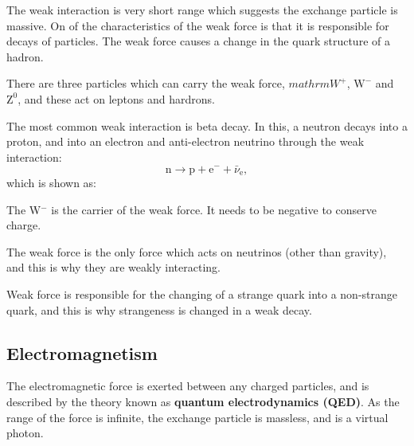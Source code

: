 \documentclass[a4paper,12pt]{article}
\begin{document}
The weak interaction is very short range which suggests the exchange particle is massive.  On of the characteristics of the weak force is that it is responsible for decays of particles.  The weak force causes a change in the quark structure of a hadron.

There are three particles which can carry the weak force, $mathrm{W}^{+}$, $\mathrm{W}^{-}$ and $\mathrm{Z}^{0}$, and these act on leptons and hardrons.

The most common weak interaction is beta decay.  In this, a neutron decays into a proton, and into an electron and anti-electron neutrino through the weak interaction:
\[\mathrm{n}\longrightarrow\mathrm{p}+\mathrm{e}^{-}+\bar{\nu}_\mathrm{e},\]
which is shown as:\\

\noindent \begin{minipage}{0.5\textwidth}
\end{minipage}
\begin{minipage}{0.5\textwidth}
The W$^{-}$ is the carrier of the weak force.  It needs to be negative to conserve charge.
\end{minipage}

The weak force is the only force which acts on neutrinos (other than gravity), and this is why they are weakly interacting.

Weak force is responsible for the changing of a strange quark into a non-strange quark, and this is why strangeness is changed in a weak decay.

\subsection{Electromagnetism}

The electromagnetic force is exerted between any charged particles, and is described by the theory known as {\bf quantum electrodynamics (QED)}.  As the range of the force is infinite, the exchange particle is massless, and is a virtual photon.
\end{document}
